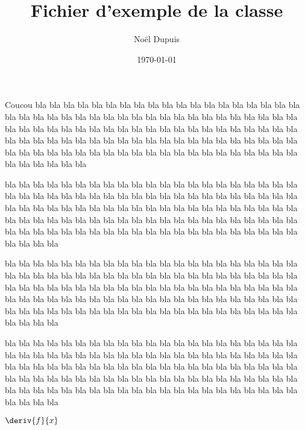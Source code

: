 \documentclass{cours}
\title{Fichier d'exemple de la classe}
\author{Noël Dupuis}
\date{\today}
\begin{document}
\maketitle

\blindtext
\begin{theoreme}{Coucou}
bla bla bla bla bla bla bla bla bla bla bla bla bla bla bla bla bla bla bla bla bla bla bla bla bla bla bla bla bla bla bla bla bla bla bla bla bla bla bla bla bla bla bla bla bla bla bla bla bla bla bla bla bla bla bla bla bla bla bla bla bla bla bla bla bla bla bla bla bla bla bla bla bla bla bla bla bla bla bla bla bla bla bla bla bla bla bla bla bla bla bla bla bla bla bla bla bla bla bla bla bla bla bla bla bla bla bla bla bla
\end{theoreme}

\blindtext
\begin{lemme}[Coucou]
bla bla bla bla bla bla bla bla bla bla bla bla bla bla bla bla bla bla bla bla bla bla bla bla bla bla bla bla bla bla bla bla bla bla bla bla bla bla bla bla bla bla bla bla bla bla bla bla bla bla bla bla bla bla bla bla bla bla bla bla bla bla bla bla bla bla bla bla bla bla bla bla bla bla bla bla bla bla bla bla bla bla bla bla bla bla bla bla bla bla bla bla bla bla bla bla bla bla bla bla bla bla bla bla bla bla bla bla bla
\end{lemme}

\begin{cor}[Coucou]
bla bla bla bla bla bla bla bla bla bla bla bla bla bla bla bla bla bla bla bla bla bla bla bla bla bla bla bla bla bla bla bla bla bla bla bla bla bla bla bla bla bla bla bla bla bla bla bla bla bla bla bla bla bla bla bla bla bla bla bla bla bla bla bla bla bla bla bla bla bla bla bla bla bla bla bla bla bla bla bla bla bla bla bla bla bla bla bla bla bla bla bla bla bla bla bla bla bla bla bla bla bla bla bla bla bla bla bla bla
\end{cor}

\begin{rem}[Coucou]
bla bla bla bla bla bla bla bla bla bla bla bla bla bla bla bla bla bla bla bla bla bla bla bla bla bla bla bla bla bla bla bla bla bla bla bla bla bla bla bla bla bla bla bla bla bla bla bla bla bla bla bla bla bla bla bla bla bla bla bla bla bla bla bla bla bla bla bla bla bla bla bla bla bla bla bla bla bla bla bla bla bla bla bla bla bla bla bla bla bla bla bla bla bla bla bla bla bla bla bla bla bla bla bla bla bla bla bla bla
\end{rem}


$\deriv {f} {x} $
\end{document}
